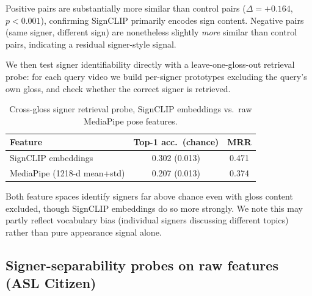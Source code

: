 Positive pairs are substantially more similar than control pairs
($\Delta=+0.164$, $p<0.001$), confirming SignCLIP primarily encodes sign
content. Negative pairs (same signer, different sign) are nonetheless
slightly \emph{more} similar than control pairs, indicating a residual
signer-style signal.

We then test signer identifiability directly with a leave-one-gloss-out
retrieval probe: for each query video we build per-signer prototypes
excluding the query's own gloss, and check whether the correct signer is
retrieved.

\begin{table}[t]
\centering\small
\begin{tabular}{lcc}
\hline
Feature & Top-1 acc.\ (chance) & MRR \\
\hline
SignCLIP embeddings & 0.302 (0.013) & 0.471 \\
MediaPipe (1218-d mean+std) & 0.207 (0.013) & 0.374 \\
\hline
\end{tabular}
\caption[Cross-gloss signer retrieval probe]{Cross-gloss signer retrieval probe, SignCLIP embeddings vs.\ raw
MediaPipe pose features.}
\label{tab:cross_gloss_signer_probe}
\end{table}

Both feature spaces identify signers far above chance even with gloss
content excluded, though SignCLIP embeddings do so more strongly. We note
this may partly reflect vocabulary bias (individual signers discussing
different topics) rather than pure appearance signal alone.

\subsection{Signer-separability probes on raw features (ASL Citizen)}
\label{sec:results-l2-raw}

